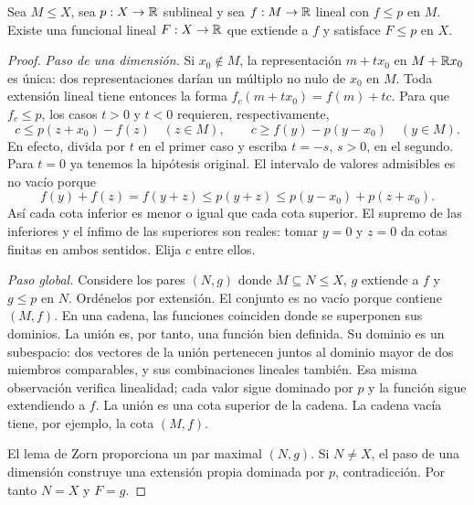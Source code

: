 \begin{teorema}\label{v3:hb-real}
Sea $M\leq X$, sea $p:X\to\mathbb R$ sublineal y sea $f:M\to\mathbb R$ lineal con $f\leq p$ en $M$. Existe una funcional lineal $F:X\to\mathbb R$ que extiende a $f$ y satisface $F\leq p$ en $X$.
\end{teorema}
\begin{proof}
\emph{Paso de una dimensión.} Si $x_0\notin M$, la representación $m+tx_0$ en $M+\mathbb R x_0$ es única: dos representaciones darían un múltiplo no nulo de $x_0$ en $M$. Toda extensión lineal tiene entonces la forma $f_c(m+tx_0)=f(m)+tc$. Para que $f_c\leq p$, los casos $t>0$ y $t<0$ requieren, respectivamente,
\[
 c\leq p(z+x_0)-f(z)\quad(z\in M),\qquad
 c\geq f(y)-p(y-x_0)\quad(y\in M).
\]
En efecto, divida por $t$ en el primer caso y escriba $t=-s$, $s>0$, en el segundo. Para $t=0$ ya tenemos la hipótesis original. El intervalo de valores admisibles es no vacío porque
\[
 f(y)+f(z)=f(y+z)\leq p(y+z)\leq p(y-x_0)+p(z+x_0).
\]
Así cada cota inferior es menor o igual que cada cota superior. El supremo de las inferiores y el ínfimo de las superiores son reales: tomar $y=0$ y $z=0$ da cotas finitas en ambos sentidos. Elija $c$ entre ellos.

\emph{Paso global.} Considere los pares $(N,g)$ donde $M\subseteq N\leq X$, $g$ extiende a $f$ y $g\leq p$ en $N$. Ordénelos por extensión. El conjunto es no vacío porque contiene $(M,f)$. En una cadena, las funciones coinciden donde se superponen sus dominios. La unión es, por tanto, una función bien definida. Su dominio es un subespacio: dos vectores de la unión pertenecen juntos al dominio mayor de dos miembros comparables, y sus combinaciones lineales también. Esa misma observación verifica linealidad; cada valor sigue dominado por $p$ y la función sigue extendiendo a $f$. La unión es una cota superior de la cadena. La cadena vacía tiene, por ejemplo, la cota $(M,f)$.

El lema de Zorn proporciona un par maximal $(N,g)$. Si $N\ne X$, el paso de una dimensión construye una extensión propia dominada por $p$, contradicción. Por tanto $N=X$ y $F=g$.
\end{proof}

